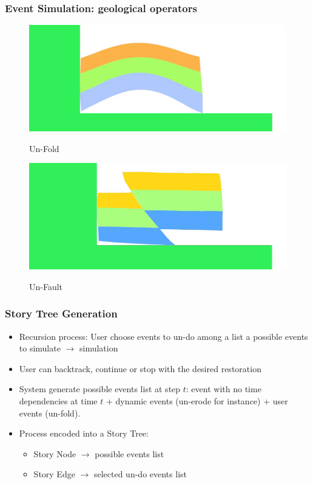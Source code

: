 \documentclass{beamer}
\begin{document}
	\begin{frame}
	\frametitle{Event Simulation:  geological operators}
	\begin{figure}[H]
	\centering
	\href{un-fold.flv}{\includegraphics[scale=0.2]{unFoldVid.png}}
	\caption{Un-Fold}
	\end{figure}
	\begin{figure}[H]
	\centering
	\href{un-Fault.flv}{\includegraphics[scale=0.2]{unFaultVid.png}}
	\caption{Un-Fault}
	\end{figure}
	\end{frame}
	
	

	\begin{frame}
	\frametitle{Story Tree Generation}
	\begin{itemize}
	\item Recursion process: User choose events to un-do among a list a possible events to simulate $\longrightarrow$ simulation
	\item User can backtrack, continue or stop with the desired restoration
	\item System generate possible events list at step $t$: event with no time dependencies at time $t$ + dynamic events (un-erode for instance) + user events (un-fold).
	\item Process encoded into a Story Tree:
	\begin{itemize}
	\item Story Node $\longrightarrow$ possible events list
	\item Story Edge $\longrightarrow$ selected un-do events  list
	\end{itemize}

	\end{itemize}
	\end{frame}
	
\end{document}

